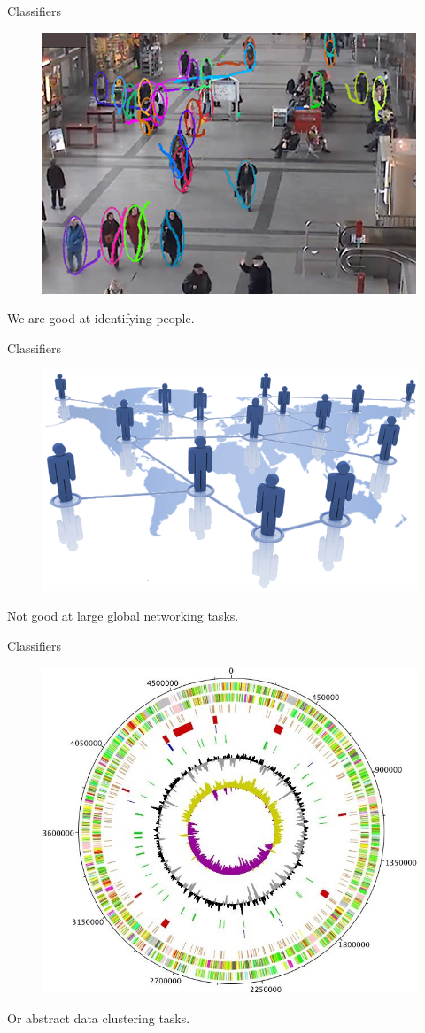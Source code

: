 \documentclass[12pt]{beamer}
\begin{document}
\begin{frame}[plain]{Classifiers}
    \begin{figure}
        \includegraphics[width=.8\textwidth]{figs/people.png}
    \end{figure}
    We are good at identifying people.
  \end{frame}

\begin{frame}[plain]{Classifiers}  
    \begin{figure}
        \includegraphics[width=.8\textwidth]{figs/social.png}
    \end{figure}
    Not good at large global networking tasks.
\end{frame}

\begin{frame}[plain]{Classifiers}  
    \begin{figure}
        \includegraphics[width=.6\textwidth]{figs/Styphi.jpg}
    \end{figure}
    Or abstract data clustering tasks.
\end{frame}
\end{document}
